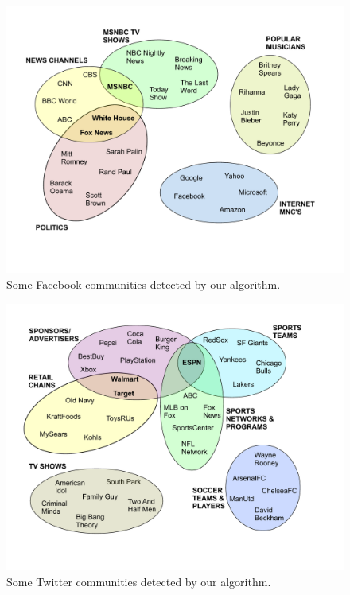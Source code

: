 \begin{figure}%
  \centering
    \includegraphics[width=1\textwidth]{communities_fb.pdf}
  \caption{Some Facebook communities detected by our algorithm.}
\label{fig-communities-fb}
\end{figure}

\begin{figure}%
  \centering
    \includegraphics[width=1\textwidth]{communities_tw.pdf}
  \caption{Some Twitter communities detected by our algorithm.}
\label{fig-communities-tw}
\end{figure}

